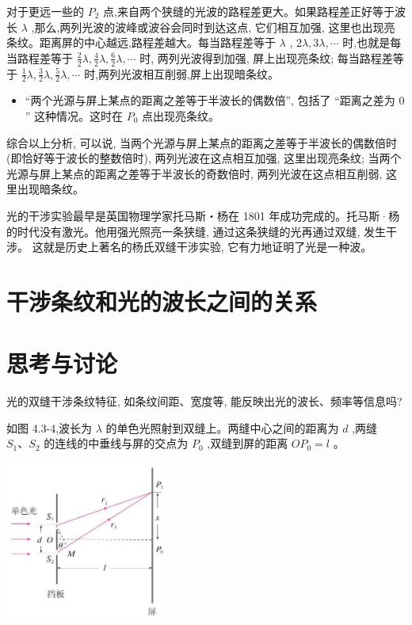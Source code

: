 \documentclass[10pt]{article}
\begin{document}
对于更远一些的 \({P}_{2}\) 点,来自两个狭缝的光波的路程差更大。如果路程差正好等于波长 \(\lambda\) ,那么,两列光波的波峰或波谷会同时到达这点, 它们相互加强, 这里也出现亮条纹。距离屏的中心越远,路程差越大。每当路程差等于 \(\lambda\) , \({2\lambda },{3\lambda },\cdots\) 时,也就是每当路程差等于 \(\frac{2}{2}\lambda ,\frac{4}{2}\lambda ,\frac{6}{2}\lambda ,\cdots\) 时, 两列光波得到加强, 屏上出现亮条纹; 每当路程差等于 \(\frac{1}{2}\lambda ,\frac{3}{2}\lambda ,\frac{5}{2}\lambda ,\cdots\) 时,两列光波相互削弱,屏上出现暗条纹。

\begin{mdframed}

\begin{itemize}
\item “两个光源与屏上某点的距离之差等于半波长的偶数倍”, 包括了 “距离之差为 0 ” 这种情况。这时在 \({P}_{0}\) 点出现亮条纹。
\end{itemize}

\end{mdframed}

综合以上分析, 可以说, 当两个光源与屏上某点的距离之差等于半波长的偶数倍时 (即恰好等于波长的整数倍时), 两列光波在这点相互加强, 这里出现亮条纹; 当两个光源与屏上某点的距离之差等于半波长的奇数倍时, 两列光波在这点相互削弱, 这里出现暗条纹。

光的干涉实验最早是英国物理学家托马斯・杨在 1801 年成功完成的。托马斯·杨的时代没有激光。他用强光照亮一条狭缝, 通过这条狭缝的光再通过双缝, 发生干涉。 这就是历史上著名的杨氏双缝干涉实验, 它有力地证明了光是一种波。

\section*{干涉条纹和光的波长之间的关系}

\section*{思考与讨论}

光的双缝干涉条纹特征, 如条纹间距、宽度等, 能反映出光的波长、频率等信息吗?

如图 4.3-4,波长为 \(\lambda\) 的单色光照射到双缝上。两缝中心之间的距离为 \(d\) ,两缝 \({S}_{1}\text{、}{S}_{2}\) 的连线的中垂线与屏的交点为 \({P}_{0}\) ,双缝到屏的距离 \(O{P}_{0} = l\) 。

\begin{center}
\includegraphics[max width=0.4\textwidth]{images/01910e4c-ebb8-7d2c-8f2f-2375bc1d2d12_102_923358.jpg}
\end{center}
\end{document}

